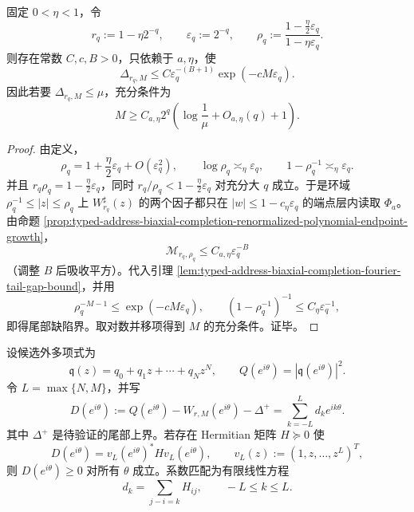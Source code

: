 \begin{proposition}\label{prop:typed-address-biaxial-completion-dyadic-fourier-tail-complexity}
固定 \(0<\eta<1\)，令
\[
r_q:=1-\eta2^{-q},
\qquad
\varepsilon_q:=2^{-q},
\qquad
\rho_q:=\frac{1-\frac{\eta}{2}\varepsilon_q}{1-\eta\varepsilon_q}.
\]
则存在常数 \(C,c,B>0\)，只依赖于 \(a,\eta\)，使
\[
\Delta_{r_q,M}
\le
C\varepsilon_q^{-(B+1)}\exp(-cM\varepsilon_q).
\]
因此若要 \(\Delta_{r_q,M}\le\mu\)，充分条件为
\[
M\ge
C_{a,\eta}2^q
\left(
\log\frac1\mu+O_{a,\eta}(q)+1
\right).
\]
\end{proposition}
\begin{proof}
由定义，
\[
\rho_q=1+\frac{\eta}{2}\varepsilon_q+O(\varepsilon_q^2),
\qquad
\log\rho_q\asymp_{\eta}\varepsilon_q,
\qquad
1-\rho_q^{-1}\asymp_{\eta}\varepsilon_q.
\]
并且 \(r_q\rho_q=1-\frac{\eta}{2}\varepsilon_q\)，同时 \(r_q/\rho_q<1-\frac{\eta}{2}\varepsilon_q\) 对充分大 \(q\) 成立。于是环域 \(\rho_q^{-1}\le |z|\le\rho_q\) 上 \(W_{r_q}^\sharp(z)\) 的两个因子都只在 \(|w|\le1-c_\eta\varepsilon_q\) 的端点层内读取 \(\Phi_a\)。由命题 \ref{prop:typed-address-biaxial-completion-renormalized-polynomial-endpoint-growth}，
\[
\mathcal M_{r_q,\rho_q}\le C_{a,\eta}\varepsilon_q^{-B}
\]
（调整 \(B\) 后吸收平方）。代入引理 \ref{lem:typed-address-biaxial-completion-fourier-tail-gap-bound}，并用
\[
\rho_q^{-M-1}\le \exp(-cM\varepsilon_q),
\qquad
(1-\rho_q^{-1})^{-1}\le C_\eta\varepsilon_q^{-1},
\]
即得尾部缺陷界。取对数并移项得到 \(M\) 的充分条件。证毕。
\end{proof}

设候选外多项式为
\[
\mathfrak q(z)=q_0+q_1z+\cdots+q_Nz^N,
\qquad
Q(e^{i\theta})=|\mathfrak q(e^{i\theta})|^2.
\]
令 \(L=\max\{N,M\}\)，并写
\[
D(e^{i\theta})
:=
Q(e^{i\theta})-W_{r,M}(e^{i\theta})-\Delta^+
=
\sum_{k=-L}^{L}d_ke^{ik\theta}.
\]
其中 \(\Delta^+\) 是待验证的尾部上界。若存在 Hermitian 矩阵 \(H\succeq0\) 使
\[
D(e^{i\theta})
=
v_L(e^{i\theta})^*Hv_L(e^{i\theta}),
\qquad
v_L(z):=(1,z,\ldots,z^L)^T,
\]
则 \(D(e^{i\theta})\ge0\) 对所有 \(\theta\) 成立。系数匹配为有限线性方程
\[
d_k=\sum_{j-i=k}H_{ij},
\qquad
-L\le k\le L.
\]

